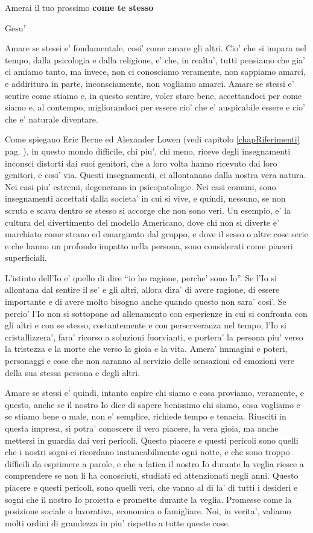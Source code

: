 \epigraph{
    Amerai il tuo prossimo \textbf{come te stesso}
 }{Gesu'}


Amare se stessi e' fondamentale, cosi' come amare gli altri. Cio' che si impara nel tempo, dalla psicologia e dalla religione, e' che, in realta', tutti pensiamo che gia' ci amiamo tanto, ma invece, non ci conosciamo veramente, non sappiamo amarci, e addiritura in parte, inconsciamente, non vogliamo amarci. 
Amare se stessi e' sentire come stiamo e, in questo sentire, voler stare bene, accettandoci per come siamo e, al contempo, migliorandoci per essere cio' che e' auspicabile essere e cio' che e' naturale diventare.

Come spiegano Eric Berne ed Alexander Lowen (vedi capitolo \ref{chapRiferimenti} pag. \pageref{chapRiferimenti}), in questo mondo difficile, chi piu', chi meno, riceve degli insegnamenti inconsci distorti dai suoi genitori, che a loro volta hanno ricevuto dai loro genitori, e cosi' via. Questi insegnamenti, ci allontanano dalla nostra vera natura. Nei casi piu' estremi, degenerano in psicopatologie. Nei casi comuni, sono insegnamenti accettati dalla societa' in cui si vive, e quindi, nessuno, se non scruta e scava dentro se stesso si accorge che non sono veri. Un esempio, e' la cultura del divertimento del modello Americano, dove chi non si diverte e' marchiato come strano ed emarginato dal gruppo, e dove il sesso o altre cose serie e che hanno un profondo impatto nella persona, sono considerati come piaceri superficiali.

L'istinto dell'Io e' quello di dire ``io ho ragione, perche' sono Io''. Se l'Io si allontana dal sentire il se' e gli altri, allora dira' di avere ragione, di essere importante e di avere molto bisogno anche quando questo non sara' cosi'. Se percio' l'Io non si sottopone ad allenamento con esperienze in cui si confronta con gli altri e con se stesso, costantemente e con perserveranza nel tempo, l'Io si cristallizzera', fara' ricorso a soluzioni fuorvianti, e portera' la persona piu' verso la tristezza e la morte che verso la gioia e la vita. Amera' immagini e poteri, personaggi e cose che non saranno al servizio delle sensazioni ed emozioni vere della sua stessa persona e degli altri.

Amare se stessi e' quindi, intanto capire chi siamo e cosa proviamo, veramente, e questo, anche se il nostro Io dice di sapere benissimo chi siamo, cosa vogliamo e se stiamo bene o male, non e' semplice, richiede tempo e tenacia. Riusciti in questa impresa, si potra' conoscere il vero piacere, la vera gioia, ma anche mettersi in guardia dai veri pericoli. Questo piacere e questi pericoli sono quelli che i nostri sogni ci ricordano instancabilmente ogni notte, e che sono troppo difficili da esprimere a parole, e che a fatica il nostro Io durante la veglia riesce a comprendere se non li ha conosciuti, studiati ed attenzionati negli anni. Questo piacere e questi pericoli, sono quelli veri, che vanno al di la' di tutti i desideri e sogni che il nostro Io proietta e promette durante la veglia. Promesse come la posizione sociale o lavorativa, economica o famigliare. Noi, in verita', valiamo molti ordini di grandezza in piu' rispetto a tutte queste cose.

